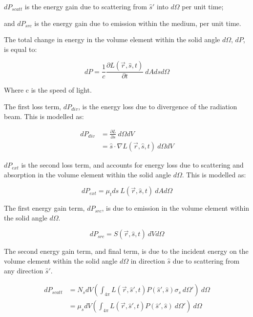 \indent $dP_{scatt}$ is the energy gain due to scattering from $\hat{s}'$ into $d\Omega$ per unit time;

\indent and $dP_{src}$ is the energy gain due to emission within the medium, per unit time.

\medskip

The total change in energy in the volume element within the solid angle $d\Omega$, $dP$, is equal to:

\begin{equation}
	dP=\frac{1}{c}\frac{\partial L(\vec{r},\hat{s},t)}{\partial t}\ dAdsd\Omega
	\label{eqn:p}
\end{equation}

\noindent Where c is the speed of light.

\medskip

The first loss term, $dP_{div}$, is the energy loss due to divergence of the radiation beam. This is modelled as:

\begin{align}
	dP_{div}&=\frac{\partial L}{\partial s}\ d\Omega dV \\
		    &=\hat{s} \cdot \nabla L(\vec{r},\hat{s},t)\ d\Omega dV
    \label{eqn:pdiv}
\end{align}

$dP_{ext}$ is the second loss term, and accounts for energy loss due to scattering and absorption in the volume element within the solid angle $d\Omega$. This is modelled as:

\begin{equation}
	dP_{ext}=\mu_t ds\ L(\vec{r},\hat{s},t)\ dAd\Omega
	\label{eqn:pext}
\end{equation}

The first energy gain term, $dP_{src}$, is due to emission in the volume element within the solid angle $d\Omega$. 

\begin{equation}
	dP_{src}=S(\vec{r},\hat{s},t)\ dVd\Omega
	\label{eqn:psrc}
\end{equation}

The second energy gain term, and final term, is due to the incident energy on the volume element within the solid angle $d\Omega$ in direction $\hat{s}$ due to scattering from any direction $\hat{s}'$.

\begin{align}
	dP_{scatt}&=N_sdV\left(\int_{4\pi}L(\vec{r},\hat{s}',t)P(\hat{s}',\hat{s})\sigma_s\ d\Omega' \right)\ d\Omega \\
			  &=\mu_sdV\left(\int_{4\pi}L(\vec{r},\hat{s}',t)P(\hat{s}',\hat{s})\ d\Omega' \right)\ d\Omega 
			  \label{eqn:pscatt}
\end{align}

